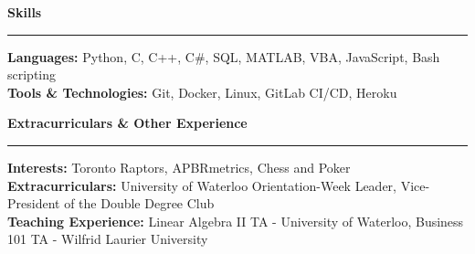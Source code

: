 \documentclass{letter}
\begin{document}
	\begin{flushleft}
		{\Large \textbf{Skills}}
		\rule[5pt]{\textwidth}{0.4pt}
		\textbf{Languages:} Python, C, C++, C\#, SQL, MATLAB, VBA, JavaScript, Bash scripting\\
		\textbf{Tools \& Technologies:} Git, Docker, Linux, GitLab CI/CD, Heroku
	\end{flushleft}

	\begin{flushleft}
		{\Large \textbf{Extracurriculars \& Other Experience}}
		\rule[5pt]{\textwidth}{0.4pt}
		\textbf{Interests:} Toronto Raptors, APBRmetrics, Chess and Poker\\
		\textbf{Extracurriculars:} University of Waterloo Orientation-Week Leader, Vice-President of the Double Degree Club\\
		\textbf{Teaching Experience:} Linear Algebra II TA - University of Waterloo, Business 101 TA - Wilfrid Laurier University
	\end{flushleft}
\end{document}
